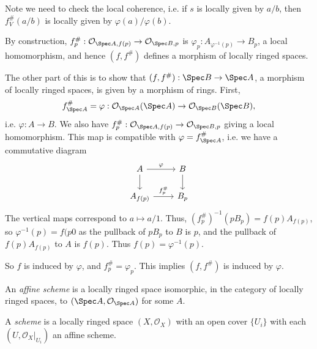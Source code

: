 \documentclass[12pt]{article}
\begin{document}
\begin{proofbox}
	Note we need to check the local coherence, i.e. if $s$ is locally given by $a/b$, then $f^{\#}_V(a/b)$ is locally given by $\varphi(a)/\varphi(b)$.

	By construction, $f^{\#}_p : \mathcal{O}_{\Spec A, f(p)} \to \mathcal{O}_{\Spec B, p}$ is $\varphi_p : A_{\varphi^{-1}(p)} \to B_p$, a local homomorphism, and hence $(f, f^{\#})$ defines a morphism of locally ringed spaces.

	The other part of this is to show that $(f, f^{\#}) : \Spec B \to \Spec A$, a morphism of locally ringed spaces, is given by a morphism of rings. First,
	\[
	f^{\#}_{\Spec A} = \varphi : \mathcal{O}_{\Spec A}(\Spec A) \to \mathcal{O}_{\Spec B}(\Spec B),
	\]
	i.e. $\varphi : A \to B$. We also have $f_p^{\#} : \mathcal{O}_{\Spec A, f(p)} \to \mathcal{O}_{\Spec B, p}$ giving a local homomorphism. This map is compatible with $\varphi = f^{\#}_{\Spec A}$, i.e. we have a commutative diagram
	\[
	\begin{tikzcd}
		A \arrow[r, "\varphi"] \arrow[d, ""] & B \arrow[d, ""] \\
		A_{f(p)} \arrow[r, "f^{\#}_p"] & B_p
	\end{tikzcd}
	\]
	The vertical maps correspond to $a \mapsto a/1$. Thus, $(f_p^{\#})^{-1}(p B_p) = f(p) A_{f(p)}$, so $\varphi^{-1}(p) = f(p0$ as the pullback of $p B_p$ to $B$ is $p$, and the pullback of $f(p) A_{f(p)}$ to $A$ is $f(p)$. Thus $f(p) = \varphi^{-1}(p)$.

	So $f$ is induced by $\varphi$, and $f_p^{\#} = \varphi_p$. This implies $(f, f^{\#})$ is induced by $\varphi$.
\end{proofbox}

\begin{definition}
	An \emph{affine scheme} is a locally ringed space isomorphic, in the category of locally ringed spaces, to $(\Spec A, \mathcal{O}_{\Spec A})$ for some $A$.

	A \emph{scheme} is a locally ringed space $(X, \mathcal{O}_X)$ with an open cover $\{U_i\}$ with each $(U, \mathcal{O}_X|_{U_i})$ an affine scheme.
\end{definition}
\end{document}
